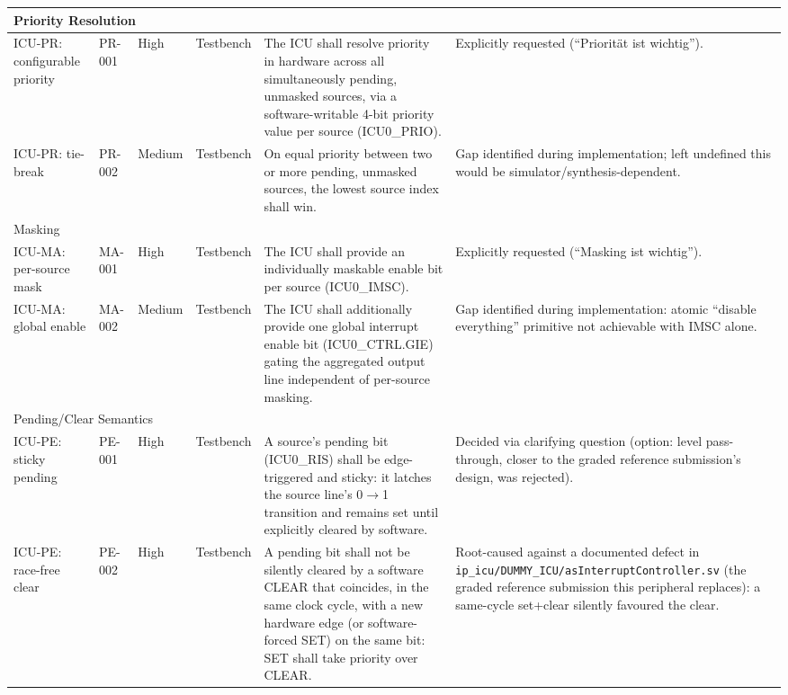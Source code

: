 \begin{longtable}{| p{} | p{} | p{} | p{} | p{} | p{} |}
\multicolumn{6}{|l|}{Priority Resolution}\\
\hline
ICU-PR: configurable priority & PR-001 & High & Testbench &
  The ICU shall resolve priority in hardware across all simultaneously
  pending, unmasked sources, via a software-writable 4-bit priority value
  per source (ICU0\_PRIO). &
  Explicitly requested (``Priorit\"at ist wichtig''). \\
\hline
ICU-PR: tie-break & PR-002 & Medium & Testbench &
  On equal priority between two or more pending, unmasked sources, the
  lowest source index shall win. &
  Gap identified during implementation; left undefined this would be
  simulator/synthesis-dependent. \\
\hline

\multicolumn{6}{|l|}{Masking}\\
\hline
ICU-MA: per-source mask & MA-001 & High & Testbench &
  The ICU shall provide an individually maskable enable bit per source
  (ICU0\_IMSC). &
  Explicitly requested (``Masking ist wichtig''). \\
\hline
ICU-MA: global enable & MA-002 & Medium & Testbench &
  The ICU shall additionally provide one global interrupt enable bit
  (ICU0\_CTRL.GIE) gating the aggregated output line independent of
  per-source masking. &
  Gap identified during implementation: atomic ``disable everything''
  primitive not achievable with IMSC alone. \\
\hline

\multicolumn{6}{|l|}{Pending/Clear Semantics}\\
\hline
ICU-PE: sticky pending & PE-001 & High & Testbench &
  A source's pending bit (ICU0\_RIS) shall be edge-triggered and sticky:
  it latches the source line's 0$\to$1 transition and remains set until
  explicitly cleared by software. &
  Decided via clarifying question (option: level pass-through, closer to
  the graded reference submission's design, was rejected). \\
\hline
ICU-PE: race-free clear & PE-002 & High & Testbench &
  A pending bit shall not be silently cleared by a software CLEAR that
  coincides, in the same clock cycle, with a new hardware edge (or
  software-forced SET) on the same bit: SET shall take priority over
  CLEAR. &
  Root-caused against a documented defect in
  \texttt{ip\_icu/DUMMY\_ICU/asInterruptController.sv} (the graded
  reference submission this peripheral replaces): a same-cycle set+clear
  silently favoured the clear. \\
\hline


\end{longtable}
